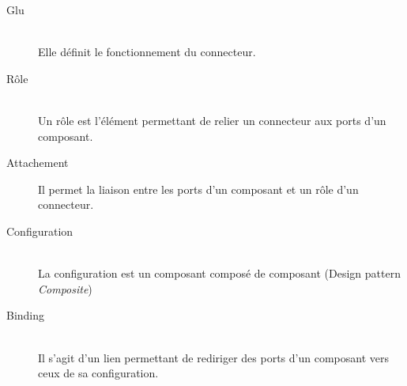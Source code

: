 \begin{description}
	\item[Glu] \hfill \\
	Elle définit le fonctionnement du connecteur.
	\item[Rôle] \hfill \\
	Un rôle est l'élément permettant de relier un connecteur aux ports d'un composant.
	\item[Attachement]
	Il permet la liaison entre les ports d'un composant et un rôle d'un connecteur.
\item[Configuration] \hfill \\
	La configuration est un composant composé de composant (Design pattern \emph{Composite})
	\item[Binding] \hfill \\
	Il s'agit d'un lien permettant de rediriger des ports d'un composant vers ceux de sa configuration.

\end{description}

